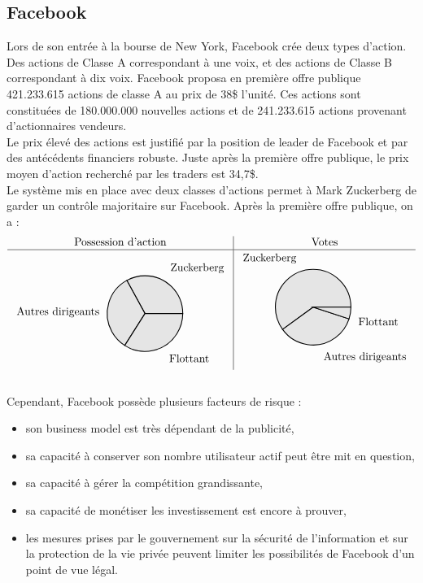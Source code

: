 \documentclass[a4paper,10pt]{article}
\newcommand{\slice}[4]{
  \pgfmathparse{0.5*#1+0.5*#2}
  \let\midangle\pgfmathresult

  \draw[thick,fill=black!10] (0,0) -- (#1:1) arc (#1:#2:1) -- cycle;

  \node[label=\midangle:#4] at (\midangle:1) {};

  \pgfmathparse{min((#2-#1-10)/110*(-0.3),0)}
  \let\temp\pgfmathresult
  \pgfmathparse{max(\temp,-0.5) + 0.8}
  \let\innerpos\pgfmathresult
  \node at (\midangle:\innerpos) {};
}
\begin{document}
\subsection{Facebook}
Lors de son entrée à la bourse de New York, Facebook crée deux types d'action. Des actions de Classe A correspondant à une voix, et des actions de Classe B correspondant à dix voix. Facebook proposa en première offre publique 421.233.615 actions de classe A au prix de 38\$ l'unité. Ces actions sont constituées de 180.000.000 nouvelles actions et de 241.233.615 actions provenant d'actionnaires vendeurs.\\
Le prix élevé des actions est justifié par la position de leader de Facebook 
et par des antécédents financiers robuste. Juste après la première offre publique, le prix moyen d'action recherché par les traders est 34,7\$.\\

Le système mis en place avec deux classes d'actions permet à Mark Zuckerberg de garder un contrôle majoritaire sur Facebook.
Après la première offre publique, on a :
\[
\begin{array}{c|c}
	\text{Possession d'action} & \text{Votes}\\
	\hline
	\begin{tikzpicture}[scale=1.2]
\newcounter{a}
\newcounter{b}
\foreach \p/\t in {33/Zuckerberg, 33/Autres dirigeants, 34/Flottant}
  {
    \setcounter{a}{\value{b}}
    \addtocounter{b}{\p}
    \slice{\thea/100*360}
          {\theb/100*360}
          {\p\%}{\t}
  }
	\end{tikzpicture}
	&
	\begin{tikzpicture}[scale=1.2]
\foreach \p/\t in {60/Zuckerberg, 35/Autres dirigeants, 5/Flottant}
  {
    \setcounter{a}{\value{b}}
    \addtocounter{b}{\p}
    \slice{\thea/100*360}
          {\theb/100*360}
          {\p\%}{\t}
  }
	\end{tikzpicture}
\end{array}
\]
\\

Cependant, Facebook possède plusieurs facteurs de risque :
\begin{itemize}
\item son business model est très dépendant de la publicité,
\item sa capacité à conserver son nombre utilisateur actif peut être mit en question,
\item sa capacité à gérer la compétition grandissante,
\item sa capacité de monétiser les investissement est encore à prouver,
\item les mesures prises par le gouvernement sur la sécurité de l'information et sur la protection de la vie privée peuvent limiter les possibilités de Facebook d'un point de vue légal.\\
\end{itemize}
\end{document}

